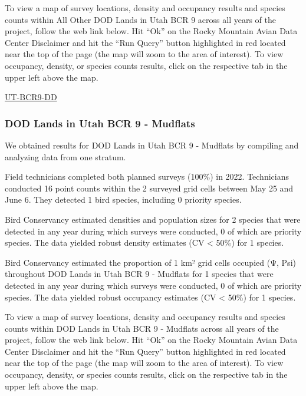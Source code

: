 \documentclass[
  letterpaper,
  DIV=11,
  numbers=noendperiod,
  oneside]{scrreprt}
\begin{document}
To view a map of survey locations, density and occupancy results and
species counts within All Other DOD Lands in Utah BCR 9 across all years
of the project, follow the web link below. Hit ``Ok'' on the Rocky
Mountain Avian Data Center Disclaimer and hit the ``Run Query'' button
highlighted in red located near the top of the page (the map will zoom
to the area of interest). To view occupancy, density, or species counts
results, click on the respective tab in the upper left above the map.

\href{http://www.rmbo.org/new_site/adc/QueryWindow.aspx\#N4IgzgLgTghhCuBbEAuABCAqgFQLQCEBhAJQE5cARC9CgUwAcYoJFaA7CNAewDM06e7MLTS40AeQgALWlDQAZGGwAmYEAF8gA===}{UT-BCR9-DD}

\hypertarget{dod-lands-in-utah-bcr-9---mudflats}{%
\subsubsection{DOD Lands in Utah BCR 9 -
Mudflats}\label{dod-lands-in-utah-bcr-9---mudflats}}

We obtained results for DOD Lands in Utah BCR 9 - Mudflats by compiling
and analyzing data from one stratum.

Field technicians completed both planned surveys (100\%) in 2022.
Technicians conducted 16 point counts within the 2 surveyed grid cells
between May 25 and June 6. They detected 1 bird species, including 0
priority species.

Bird Conservancy estimated densities and population sizes for 2 species
that were detected in any year during which surveys were conducted, 0 of
which are priority species. The data yielded robust density estimates
(CV \textless{} 50\%) for 1 species.

Bird Conservancy estimated the proportion of 1 km² grid cells occupied
(Ψ, Psi) throughout DOD Lands in Utah BCR 9 - Mudflats for 1 species
that were detected in any year during which surveys were conducted, 0 of
which are priority species. The data yielded robust occupancy estimates
(CV \textless{} 50\%) for 1 species.

To view a map of survey locations, density and occupancy results and
species counts within DOD Lands in Utah BCR 9 - Mudflats across all
years of the project, follow the web link below. Hit ``Ok'' on the Rocky
Mountain Avian Data Center Disclaimer and hit the ``Run Query'' button
highlighted in red located near the top of the page (the map will zoom
to the area of interest). To view occupancy, density, or species counts
results, click on the respective tab in the upper left above the map.
\end{document}
